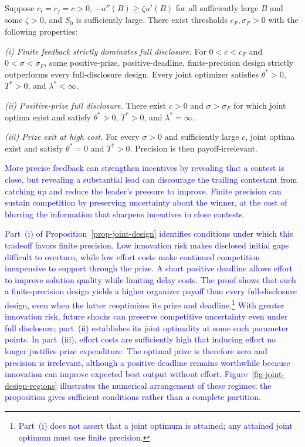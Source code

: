 \documentclass[mnsc]{informs3}
\begin{document}
\begin{proposition}\label{prop-joint-design}
{Suppose $c_i=c_j=c>0$, $-u''(B)\geq\zeta u'(B)$ for all sufficiently large $B$ and some $\zeta>0$, and $S_0$ is sufficiently large. There exist thresholds $c_F,\sigma_F>0$ with the following properties:}

{\emph{(i) Finite feedback strictly dominates full disclosure.}
For $0<c<c_F$ and $0<\sigma<\sigma_F$, some positive-prize,
positive-deadline, finite-precision design strictly outperforms every
full-disclosure design. Every joint optimizer satisfies $\theta^*>0$,
$T^*>0$, and $\lambda^*<\infty$.}

\emph{(ii) Positive-prize full disclosure.}
There exist $c>0$ and $\sigma>\sigma_F$ for which joint optima exist and satisfy $\theta^*>0$, $T^*>0$, and $\lambda^*=\infty$.

\emph{(iii) Prize exit at high cost.}
For every $\sigma>0$ and sufficiently large $c$, joint optima exist and satisfy $\theta^*=0$ and $T^*>0$. Precision is then payoff-irrelevant.
\end{proposition}

\textcolor{blue}{More precise feedback can strengthen incentives by revealing that a contest is close, but revealing a substantial lead can discourage the trailing contestant from catching up and reduce the leader's pressure to improve. Finite precision can sustain competition by preserving uncertainty about the winner, at the cost of blurring the information that sharpens incentives in close contests.}

\textcolor{blue}{Part~(i) of Proposition~\ref{prop-joint-design} identifies conditions under which this tradeoff favors finite precision. Low innovation risk makes disclosed initial gaps difficult to overturn, while low effort costs make continued competition inexpensive to support through the prize. A short positive deadline allows effort to improve solution quality while limiting delay costs. The proof shows that such a finite-precision design yields a higher organizer payoff than every full-disclosure design, even when the latter reoptimizes its prize and deadline.}\footnote{\textcolor{blue}{Part~(i) does not assert that a joint optimum is attained; any attained joint optimum must use finite precision.}} \textcolor{blue}{With greater innovation risk, future shocks can preserve competitive uncertainty even under full disclosure; part~(ii) establishes its joint optimality at some such parameter points. In part~(iii), effort costs are sufficiently high that inducing effort no longer justifies prize expenditure. The optimal prize is therefore zero and precision is irrelevant, although a positive deadline remains worthwhile because innovation can improve expected best output without effort. Figure~\ref{fig-joint-design-regions} illustrates the numerical arrangement of these regimes; the proposition gives sufficient conditions rather than a complete partition.}
\end{document}
